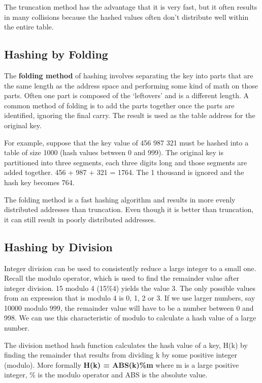 The truncation method has the advantage that it is very fast, but it often results in many collisions because the hashed values often don’t distribute well within the entire table.

\subsection{Hashing by Folding}

The \textbf{folding method} of hashing involves separating the key into parts that are the same length as the address space and performing some kind of math on those parts.  Often one part is composed of the ‘leftovers’ and is a different length.  A common method of folding is to add the parts together once the parts are identified, ignoring the final carry.   The result is used as the table address for the original key.


For example, suppose that the key value of 456 987 321 must be hashed into a table of size 1000 (hash values between 0 and 999). The original key is partitioned into three segments, each three digits long and those segments are added together. 456 + 987 + 321 = 1764. The 1 thousand is ignored and the hash key becomes 764.

The folding method is a fast hashing algorithm and results in more evenly distributed addresses than truncation.  Even though it is better than truncation, it can still result in poorly distributed addresses.

\subsection{Hashing by Division}

Integer division can be used to consistently reduce a large integer to a small one.  Recall the modulo operator, which is used to find the remainder value after integer division.   15 modulo 4 (15\%4) yields the value 3.    The only possible values from an expression that is modulo 4 is 0, 1, 2 or 3.    If we use larger numbers,  say 10000 modulo 999,  the remainder value will have to be  a number between 0 and 998.  We can use this characteristic of  modulo to calculate a hash value of a large number.

The division method hash function calculates the hash value of a key, H(k) by finding the remainder that results from dividing k by some positive integer (modulo). More formally \textbf{H(k) = ABS(k)\%m} where m is a large positive integer, \% is the modulo operator and ABS is the absolute value.

